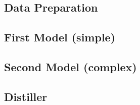 \subsection{Data Preparation}


\subsection{First Model (simple)}


\subsection{Second Model (complex)}


\subsection{Distiller}


